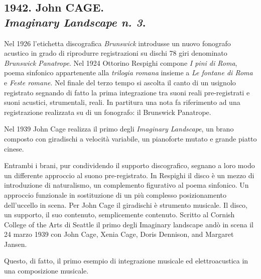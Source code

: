 
\subsection*{1942. John CAGE. \\ \emph{Imaginary Landscape n. 3}.}

\vfill

Nel 1926 l'etichetta discografica \emph{Brunswick} introdusse un nuovo fonografo
acustico in grado di riprodurre registrazioni su dischi 78 giri denominato
\emph{Brunswick Panatrope}. Nel 1924 Ottorino Respighi compone \emph{I pini di
Roma}, poema sinfonico appartenente alla \emph{trilogia romana} insieme a
\emph{Le fontane di Roma} e \emph{Feste romane}. Nel finale del terzo tempo si
ascolta il canto di un usignolo registrato segnando di fatto la prima integrazione
tra suoni reali pre-registrati e suoni acustici, strumentali, reali. In partitura
una nota fa riferimento ad una registrazione realizzata su di un fonografo: il
Brunswick Panatrope.

Nel 1939 John Cage realizza il primo degli \emph{Imaginary Landscape}, un brano
composto con giradischi a velocità variabile, un pianoforte mutato e grande piatto
cinese.

Entrambi i brani, pur condividendo il supporto discografico, segnano a loro modo
un differente approccio al suono pre-registrato. In Respighi il disco è un mezzo
di introduzione di naturalismo, un complemento figurativo al poema sinfonico. Un
approccio funzionale in sostituzione di un più complesso posizionamento dell'uccello
in scena. Per John Cage il giradischi è strumento musicale. Il disco, un supporto,
il suo contenuto, semplicemente contenuto. Scritto al Cornish College of the Arts di
Seattle il primo degli Imaginary landscape andò in scena il 24 marzo 1939 con John
Cage, Xenia Cage, Doris Dennison, and Margaret Jansen.

Questo, di fatto, il primo esempio di integrazione musicale ed elettroacustica in
una composizione musicale.

%
% 
%
%

